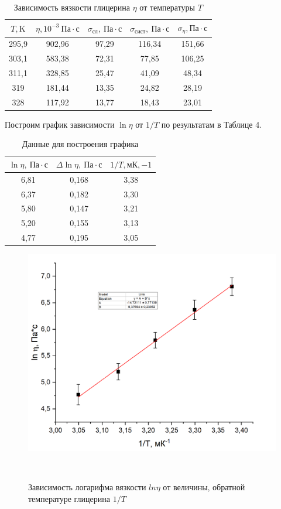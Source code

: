 \documentclass[a4paper,12pt]{article}
\theoremstyle{plain} %
\theoremstyle{definition} %
\theoremstyle{remark} %
\begin{document}
\begin{table}[h]
	\begin{center}
	\begin{tabular}{|c|c|c|c|c|}
		\hline
		$T, \text{K}$   & $\eta, 10^{-3} \ \text{Па}\cdot \text{с}$ & $\sigma_\text{сл}, \ \text{Па}\cdot \text{с}$    & $\sigma_\text{сист}, \ \text{Па}\cdot \text{с}$     & $\sigma_\eta, \text{Па}\cdot \text{с}$  \\ \hline
		295,9 & 902,96 & 97,29 & 116,34 & 151,66 \\ \hline
		303,1 & 583,38 & 72,31 & 77,85  & 106,25 \\ \hline
		311,1 & 328,85 & 25,47 & 41,09  & 48,34  \\ \hline
		319   & 181,44 & 13,35 & 24,82  & 28,19  \\ \hline
		328   & 117,92 & 13,77 & 18,43  & 23,01  \\ \hline
	\end{tabular}
\end{center}
\caption{Зависимость вязкости глицерина $\eta$ от температуры $T$}
\end{table}

Построим график зависимости $\ln\eta$ от $1/T$ по результатам в Таблице 4.

\begin{table}[h]
	\begin{center}
	\begin{tabular}{|c|c|c|}
		\hline
		$\ln\eta, \ \text{Па}\cdot \text{с}$   & $\Delta \ln\eta, \ \text{Па}\cdot \text{с}$   & $1/T, \text{мК},{-1}$  \\ \hline
		6,81 & 0,168 & 3,38 \\ \hline
		6,37 & 0,182 & 3,30 \\ \hline
		5,80 & 0,147 & 3,21 \\ \hline
		5,20 & 0,155 & 3,13 \\ \hline
		4,77 & 0,195 & 3,05 \\ \hline
	\end{tabular}
\end{center}
\caption{Данные для построения графика}
\end{table}

 \begin{figure}[!h]
	\begin{center}
		\includegraphics[width=0.7\linewidth]{3}
	\end{center}\
	\caption{Зависимость логарифма вязкости $ln \eta$ от величины, обратной температуре глицерина $1/T$ }
\end{figure}
\end{document}

